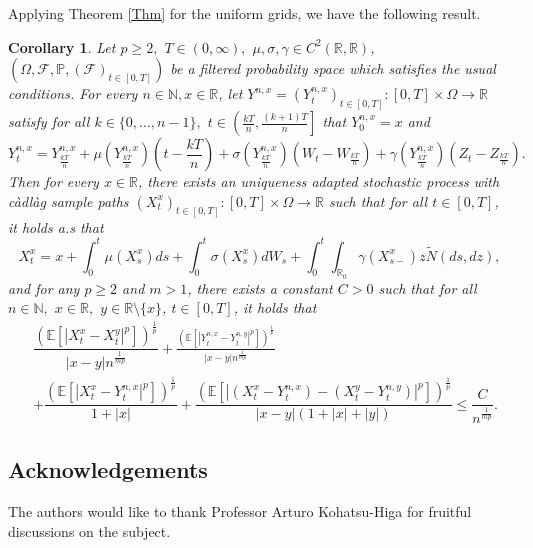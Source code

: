 \documentclass[11pt]{article}
\theoremstyle{theorem}
\newtheorem{Cor}[Def]{Corollary}
\theoremstyle{definition}
\newcommand{\bR}{\mathbb{R}}
\newcommand{\mf}{\mathcal{F}}
\newcommand{\pr}{\mathbb{P}}
\newcommand{\Om}{\Omega}
\newcommand{\1}{{\bf 1}}
\begin{document}
Applying Theorem \ref{Thm} for the uniform grids, we have the following result. 
\begin{Cor}
 \label{Thm1.1}
    Let $p \ge 2,$ 
    $T\in (0, \infty),$ $\mu, \sigma, \gamma  \in C^2(\mathbb{R}, \mathbb{R})$, $(\Om, \mf, \pr, (\mathcal{F})_{t\in [0, T]})$ be a filtered probability space which satisfies the usual conditions. %
    For every $n \in \mathbb{N}, x\in \mathbb{R}$, let $Y^{n,x} = \left(Y^{n, x}_t \right)_{t\in [0, T]}: [0, T] \times \Om \to \mathbb{R}$ satisfy for all $k \in \{0, \dots, n-1\},$ $t\in \left( \frac{kT}{n}, \frac{(k+1)T}{n} \right]$ that $Y_0^{n, x}=x$ and 
    $$Y_{t}^{n, x} = Y_{\frac{kT}{n}}^{n, x}+\mu \left(Y_\frac{kT}{n}^{n, x}\right) \left (t- \frac{kT}{n} \right) +\sigma \left(Y_\frac{kT}{n}^{n, x}\right) \left(W_{t}- W_{\frac{kT}{n}}\right) +  \gamma (Y_\frac{kT}{n}^{n, x})\left(Z_{t}- Z_{\frac{kT}{n}}\right).$$ 
    Then for 
    every $x\in \mathbb{R}$, there exists an uniqueness adapted stochastic process with c\`adl\`ag sample paths $(X_t^x)_{t\in [0, T]}: [0, T]\times \Om \to \mathbb{R}$ such that for all $t\in [0, T]$, it holds a.s that $$X_t^x=x+\int^t_0\mu(X^x_s)ds+\int^t_0\sigma(X^x_s)dW_s + \int^t_0 \int_{\bR_0} \gamma (X^x_{s-})z \widetilde{N}(d s, d z),$$ and 
    for any $p \geq 2$ and $m > 1$, there exists a constant $C> 0$ such that for all $n\in \mathbb{N},$  $x \in \mathbb{R},$ $y\in \mathbb{R} \setminus \{x\}$, $t\in [0, T]$, it holds that 
        \begin{align*}
        &  \dfrac{\left(\mathbb{E}\left[\left|X^x_{t}-X^{y}_{t}\right|^p\right]\right)^{\frac{1}{p}}}{|x-y| n^{\frac{1}{mp}}} 
        + \frac{\left(\mathbb{E}\left[\left|Y^{n,x}_{t}-Y^{n,y}_{t}\right|^p\right]\right)^{\frac{1}{p}}}{|x-y| n^{\frac{1}{mp}}}\\
&+\dfrac{\left(\mathbb{E}\left[\left|X^x_{t}-Y^{n, x}_t\right|^p\right]\right)^{\frac{1}{p}}}{1+|x|}+\dfrac{\left(\mathbb{E}\left[\left|\left(X^x_{t}-Y^{n, x}_t\right)-\left(X^y_{t}-Y^{n, y}_t\right)\right|^p\right]\right)^{\frac{1}{p}}}{|x-y|(1+|x|+|y|)} \leq \dfrac{C}{n^{\frac{1}{mp}}}.
        \end{align*}
\end{Cor}

\subsection*{Acknowledgements} 
The authors would like to thank Professor Arturo Kohatsu-Higa for fruitful discussions on the subject.
\end{document}
